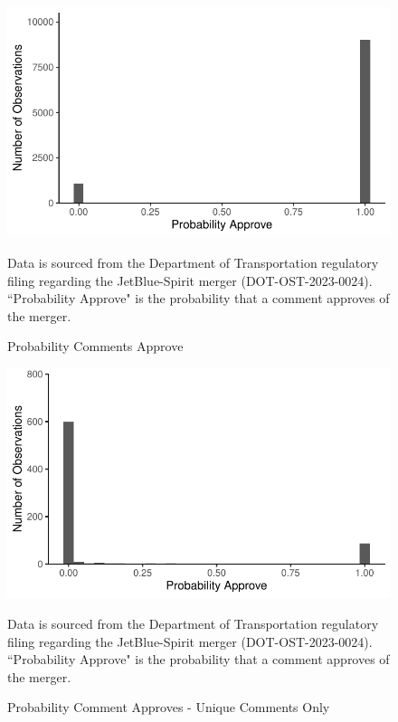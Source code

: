 \documentclass{article}
\begin{document}
\begin{appendices}
	\begin{figure}
		\caption{Probability Comments Approve}
		\label{fig:ProbabilityApprove}
		\includegraphics{05.Figures/stance_strength_graph}
		\begin{minipage}{\textwidth} 
			{\footnotesize Data is sourced from the Department of Transportation regulatory filing regarding the JetBlue-Spirit merger (DOT-OST-2023-0024). ``Probability Approve" is the probability that a comment approves of the merger.} 
		\end{minipage}
	\end{figure}
	
	\begin{figure}
		\caption{Probability Comment Approves - Unique Comments Only}
		\label{fig:ProbabilityApprove_Unique}
		\includegraphics{05.Figures/stance_strength_unique.pdf}
				\begin{minipage}{\textwidth} 
			{\footnotesize Data is sourced from the Department of Transportation regulatory filing regarding the JetBlue-Spirit merger (DOT-OST-2023-0024). ``Probability Approve" is the probability that a comment approves of the merger.} 
		\end{minipage}
	\end{figure}
	
	
\end{appendices}
	
\end{document}
